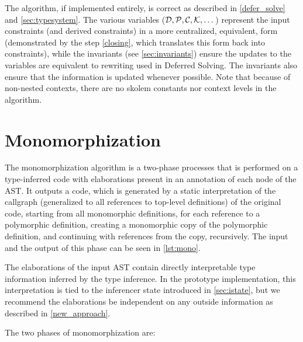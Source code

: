 \begin{remark}
    The algorithm, if implemented entirely, is correct as described in \cref{defer_solve} and \cref{sec:typesystem}. The various variables ($\mathcal D, \mathcal P, \mathcal C, \mathcal K, \dots$) represent the input constraints (and derived constraints) in a more centralized, equivalent, form (demonstrated by the step \ref{closing}, which translates this form back into constraints), while the invariants (see \cref{sec:invariants}) ensure the updates to the variables are equivalent to rewriting used in Deferred Solving. The invariants also ensure that the information is updated whenever possible. Note that because of non-nested contexts, there are no skolem constants nor context levels in the algorithm.
\end{remark}

\section{Monomorphization}

The monomorphization algorithm is a two-phase processes that is performed on a type-inferred code with elaborations present in an annotation of each node of the AST. It outputs a code, which is generated by a static interpretation of the callgraph (generalized to all references to top-level definitions) of the original code, starting from all monomorphic definitions, for each reference to a polymorphic definition, creating a monomorphic copy of the polymorphic definition, and continuing with references from the copy, recursively. The input and the output of this phase can be seen in \cref{lst:mono}.

The elaborations of the input AST contain directly interpretable type information inferred by the type inference. In the prototype implementation, this interpretation is tied to the inferencer state introduced in \cref{sec:istate}, but we recommend the elaborations be independent on any outside information as described in \cref{new_approach}.

The two phases of monomorphization are:


